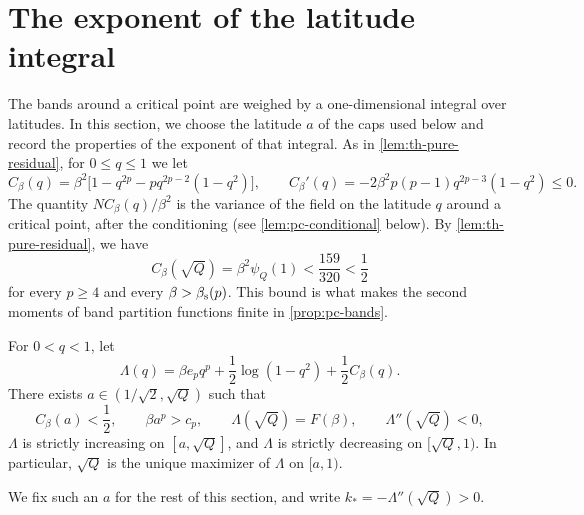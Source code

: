 \section{The exponent of the latitude integral}\label{sec:pc-scalar}

The bands around a critical point are weighed by a one-dimensional integral over latitudes. In this section, we choose the latitude $a$ of the caps used below and record the properties of the exponent of that integral. As in \cref{lem:th-pure-residual}, for $0\le q\le1$ we let
\begin{equation}\label{eq:pc-Cbeta}
C_\beta(q)=\beta^2\bigl[1-q^{2p}-pq^{2p-2}(1-q^2)\bigr],\qquad C_\beta'(q)=-2\beta^2p(p-1)q^{2p-3}(1-q^2)\le0.
\end{equation}
The quantity $NC_\beta(q)/\beta^2$ is the variance of the field on the latitude $q$ around a critical point, after the conditioning (see \cref{lem:pc-conditional} below). By \cref{lem:th-pure-residual}, we have
\begin{equation}\label{eq:pc-residual}
C_\beta(\sqrt Q)=\beta^2\psi_Q(1)<\frac{159}{320}<\frac12
\end{equation}
for every $p\ge4$ and every $\beta>\beta_{\mathrm s}(p)$. This bound is what makes the second moments of band partition functions finite in \cref{prop:pc-bands}.

\begin{lemma}\label{lem:pc-saddle}
For $0<q<1$, let
\[
\Lambda(q)=\beta e_pq^p+\frac12\log(1-q^2)+\frac12C_\beta(q).
\]
There exists $a\in(1/\sqrt2,\sqrt Q)$ such that
\begin{equation}\label{eq:pc-cap}
C_\beta(a)<\frac12,\qquad \beta a^p>c_p,\qquad \Lambda(\sqrt Q)=F(\beta),\qquad \Lambda''(\sqrt Q)<0,
\end{equation}
$\Lambda$ is strictly increasing on $[a,\sqrt Q]$, and $\Lambda$ is strictly decreasing on $[\sqrt Q,1)$. In particular, $\sqrt Q$ is the unique maximizer of $\Lambda$ on $[a,1)$.
\end{lemma}

We fix such an $a$ for the rest of this section, and write $k_*=-\Lambda''(\sqrt Q)>0$.

